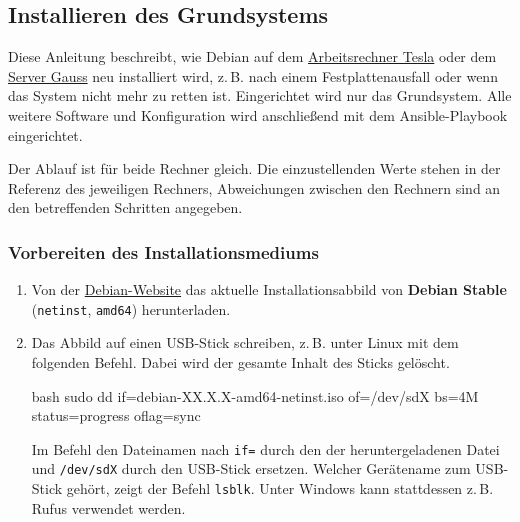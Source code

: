 \subsection{Installieren des Grundsystems}
\label{grundsystem-installieren}
Diese Anleitung beschreibt, wie Debian auf dem \hyperref[tesla]{Arbeitsrechner Tesla} oder dem \hyperref[gauss]{Server Gauss} neu installiert wird, z.\,B. nach einem Festplattenausfall oder wenn das System nicht mehr zu retten ist. Eingerichtet wird nur das Grundsystem. Alle weitere Software und Konfiguration wird anschließend mit dem Ansible-Playbook eingerichtet.

Der Ablauf ist für beide Rechner gleich. Die einzustellenden Werte stehen in der Referenz des jeweiligen Rechners, Abweichungen zwischen den Rechnern sind an den betreffenden Schritten angegeben.


\subsubsection{Vorbereiten des Installationsmediums}
\label{grundsystem-installieren-medium}
\begin{enumerate}
	\item Von der \href{https://www.debian.org/download}{Debian-Website} das aktuelle Installationsabbild von \textbf{Debian Stable} (\texttt{netinst}, \texttt{amd64}) herunterladen.
	\item Das Abbild auf einen USB-Stick schreiben, z.\,B. unter Linux mit dem folgenden Befehl. Dabei wird der gesamte Inhalt des Sticks gelöscht.
	      \begin{Codeblock}{bash}
		      sudo dd if=debian-XX.X.X-amd64-netinst.iso of=/dev/sdX bs=4M status=progress oflag=sync
	      \end{Codeblock}
	      Im Befehl den Dateinamen nach \texttt{if=} durch den der heruntergeladenen Datei und \texttt{/dev/sdX} durch den USB-Stick ersetzen. Welcher Gerätename zum USB-Stick gehört, zeigt der Befehl \texttt{lsblk}. Unter Windows kann stattdessen z.\,B. Rufus verwendet werden.
\end{enumerate}

